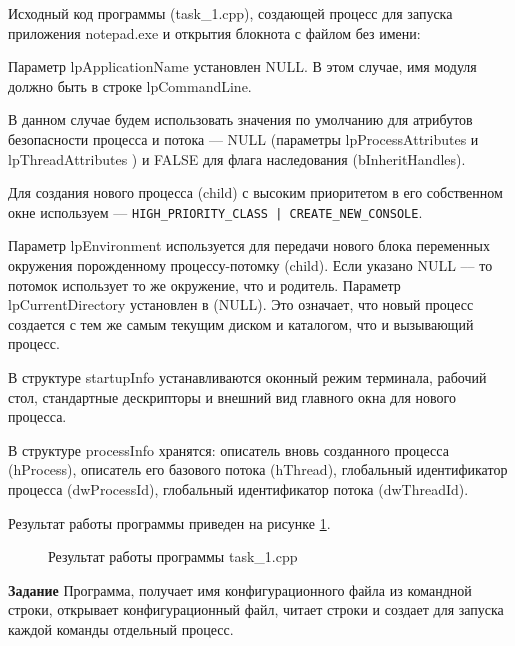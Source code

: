 \documentclass[a4paper]{article}
\begin{document}
	Исходный код программы (task\_1.cpp), создающей процесс для запуска приложения notepad.exe и открытия блокнота с файлом без имени:
	
	
	Параметр lpApplicationName установлен NULL. В этом случае, имя модуля должно быть в строке lpCommandLine.
	
	В данном случае будем использовать значения по умолчанию для атрибутов безопасности процесса и потока --– NULL (параметры lpProcessAttributes и lpThreadAttributes ) и FALSE для флага наследования (bInheritHandles).
	
	Для создания нового процесса (child) с высоким приоритетом в его собственном окне используем --- \texttt{HIGH\_PRIORITY\_CLASS | CREATE\_NEW\_CONSOLE}.
	
	Параметр lpEnvironment используется для передачи нового блока переменных окружения порожденному процессу-потомку (child). Если указано NULL –-- то потомок использует то же окружение, что и родитель.
Параметр lpCurrentDirectory установлен в (NULL). Это означает, что новый процесс создается с тем же самым текущим диском и каталогом, что и вызывающий процесс.
	
	В структуре startupInfo устанавливаются оконный режим терминала, рабочий стол, стандартные дескрипторы и внешний вид главного окна для нового процесса.
	
	В структуре processInfo хранятся: описатель вновь созданного процесса (hProcess), описатель его базового потока (hThread), глобальный идентификатор процесса (dwProcessId), глобальный идентификатор потока (dwThreadId).
	
	Результат работы программы приведен на рисунке \ref{img:task1}.
	\begin{figure}[h]
		\caption{Результат работы программы task\_1.cpp}
		\label{img:task1}
	\end{figure}
	
	\textbf{Задание} Программа, получает имя конфигурационного файла из командной строки, открывает конфигурационный файл, читает строки и создает для запуска каждой команды отдельный процесс.
	
\end{document}
